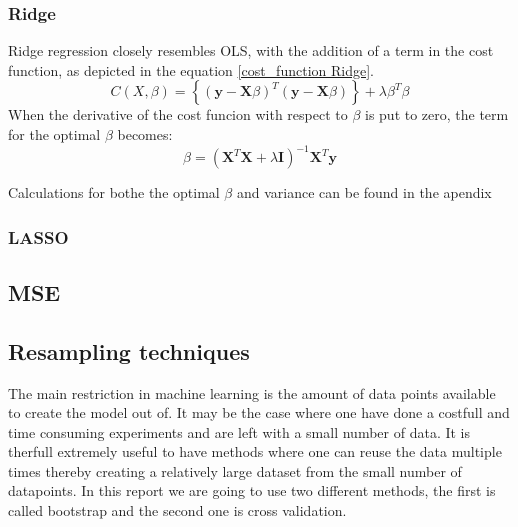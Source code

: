 \subsubsection{Ridge}
\noindent Ridge regression closely resembles OLS, with the addition of a term in the 
cost function, as depicted in the equation \eqref{cost_function Ridge}.
\begin{equation}
    C(X,\beta) =  \left\lbrace ( \textbf{y} - \textbf{X}\beta )^T (\textbf{y} - \textbf{X}\beta)\right\rbrace + \lambda \beta^T \beta \label{cost_function Ridge}
\end{equation}
When the derivative of the cost funcion with respect to $\beta$ is put to zero, the
term for the optimal $\beta$ becomes:
\begin{equation}
    \beta = (\textbf{X}^T \textbf{X} + \lambda \textbf{I})^{-1}\textbf{X}^T \textbf{y}
\end{equation}


Calculations for bothe the optimal $\beta$ and variance can be found in the apendix
\subsubsection{LASSO}

\subsection{MSE}


\subsection{Resampling techniques}

\noindent The main restriction in machine learning is 
the amount of data points available to create the model out of. It may be the case where one have
done a costfull and time consuming experiments and are left with a small number of data. 
It is therfull extremely useful to have methods where one can reuse the data multiple times
thereby creating a relatively large dataset from the small number of datapoints. In this report
we are going to use two different methods, the first is called bootstrap and the second one is cross validation.

